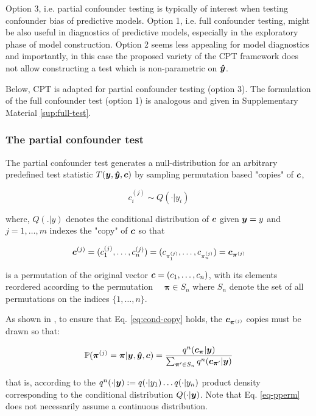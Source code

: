 \documentclass{article}
\begin{document}
Option 3, i.e. partial confounder testing is typically of interest when testing confounder bias of predictive models. Option 1, i.e. full confounder testing, might be also useful in diagnostics of predictive models, especially in the exploratory phase of model construction. Option 2 seems less appealing for model diagnostics and importantly, in this case the proposed variety of the CPT framework does not allow constructing a test which is non-parametric on $\boldsymbol{\hat{y}}$.

Below, CPT is adapted for partial confounder testing (option 3). The formulation of the full confounder test (option 1) is analogous and given in Supplementary Material \ref{sup:full-test}.
\subsubsection*{The partial confounder test}

The partial confounder test generates a null-distribution for an arbitrary predefined test statistic $T(\boldsymbol{y},\boldsymbol{\hat{y}},\boldsymbol{c})$ by sampling permutation based "copies" of $\boldsymbol{c}$,

\begin{equation}
    c_i^{(j)} \sim Q(\cdot|y_i)
     \label{eq:cond-copy}
\end{equation}

where, $Q(.|y)$ denotes the conditional distribution of $\boldsymbol{c}$ given $\boldsymbol{y}=y$ and $j=1,\dots, m$ indexes the "copy" of $\boldsymbol{c}$ so that

$$ \boldsymbol{c}^{(j)} = (c_1^{(j)}, \dots, c_n^{(j)}) = (c_{\pi_1^{(j)}}, \dots, c_{\pi_n^{(j)}}) =  \boldsymbol{c}_{\boldsymbol{\pi}^{(j)}} $$

is a permutation of the original vector $\boldsymbol{c} = (c_1, \dots, c_n)$, with its elements reordered according to the permutation $\quad \boldsymbol{\pi} \in S_n$ where $S_n$ denote the set of all permutations on the indices $\{1,\dots,n\}$.

As shown in \citep{berrett2020conditional}, to ensure that Eq. \ref{eq:cond-copy} holds, the $\boldsymbol{c}_{\boldsymbol{\pi}^{(j)}}$ copies must be drawn so that:

\begin{equation}
    \label{eq-pperm}
    \mathbb{P}(\boldsymbol{ \pi }^{(j)} = \boldsymbol{ \pi } | \boldsymbol{y},\boldsymbol{\hat{y}},\boldsymbol{c}) = \frac{q^n(\boldsymbol{c}_{\boldsymbol{ \pi }} | \boldsymbol{y})}{\sum_{\boldsymbol{ \pi } ' \in S_n} q^n(\boldsymbol{c}_{\boldsymbol{ \pi } ' } | \boldsymbol{y})}
\end{equation}


that is, according to the $q^n(\cdot|\boldsymbol{y}) := q(\cdot | y_1) \dots q(\cdot|y_n)$ product density corresponding to the conditional distribution $Q(\cdot|\boldsymbol{y})$. Note that Eq. \ref{eq-pperm} does not necessarily assume a continuous distribution.
\end{document}
